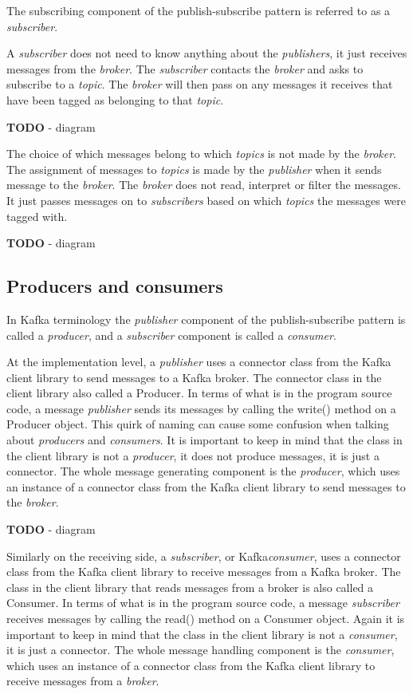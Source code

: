 \documentclass{article}
\newcommand{\kafka} {Kafka\xspace}
\newcommand{\kftopic} {\textit{topic}\xspace}
\newcommand{\kftopics} {\textit{topics}\xspace}
\newcommand{\kfbroker} {\textit{broker}\xspace}
\newcommand{\kfconsumer} {\textit{consumer}\xspace}
\newcommand{\kfconsumers} {\textit{consumers}\xspace}
\newcommand{\kfproducer} {\textit{producer}\xspace}
\newcommand{\kfproducers} {\textit{producers}\xspace}
\newcommand{\kfpublisher} {\textit{publisher}\xspace}
\newcommand{\kfpublishers} {\textit{publishers}\xspace}
\newcommand{\kfsubscriber} {\textit{subscriber}\xspace}
\newcommand{\kfsubscribers} {\textit{subscribers}\xspace}
\newcommand{\javaname}[1] {{\ttfamily\color{codeblue} #1}}
\begin{document}
The subscribing component of the publish-subscribe pattern is referred to as a \kfsubscriber.

A \kfsubscriber does not need to know anything about the \kfpublishers, it just receives messages from the \kfbroker. 
The \kfsubscriber contacts the \kfbroker and asks to subscribe to a \kftopic. The \kfbroker will then pass on any messages it receives that have been tagged as belonging to that \kftopic.

\textbf{TODO} - diagram

The choice of which messages belong to which \kftopics is not made by the \kfbroker. The assignment of messages to \kftopics is made by the \kfpublisher when it sends message to the \kfbroker.
The \kfbroker does not read, interpret or filter the messages. It just passes messages on to \kfsubscribers based on which \kftopics the messages were tagged with. 

\textbf{TODO} - diagram

\subsection{Producers and consumers}
\label{kafka-producer-consumer}

In \kafka terminology the \kfpublisher component of the publish-subscribe pattern is called a \kfproducer, and a \kfsubscriber component is called a \kfconsumer.

At the implementation level, a \kfpublisher uses a connector class from the \kafka client library to send messages to a \kafka broker.
The connector class in the client library also called a \javaname{Producer}.
In terms of what is in the program source code, a message \kfpublisher sends its messages by calling the \javaname{write()} method on a \javaname{Producer} object.
This quirk of naming can cause some confusion when talking about \kfproducers and \kfconsumers.
It is important to keep in mind that the class in the client library is not a \kfproducer, it does not produce messages, it is just a connector. The whole message generating component is the \kfproducer, which uses an instance of a connector \javaname{class} from the \kafka client library to send messages to the \kfbroker.

\textbf{TODO} - diagram

Similarly on the receiving side, a \kfsubscriber, or \kafka \kfconsumer, uses a connector class from the \kafka client library to receive messages from a \kafka broker.
The class in the client library that reads messages from a broker is also called a \javaname{Consumer}. In terms of what is in the program source code, a message \kfsubscriber receives messages by calling the \javaname{read()} method on a \javaname{Consumer} object.
Again it is important to keep in mind that the class in the client library is not a \kfconsumer, it is just a connector. The whole message handling component is the \kfconsumer, which uses an instance of a connector \javaname{class} from the \kafka client library to receive messages from a \kfbroker.
\end{document}
